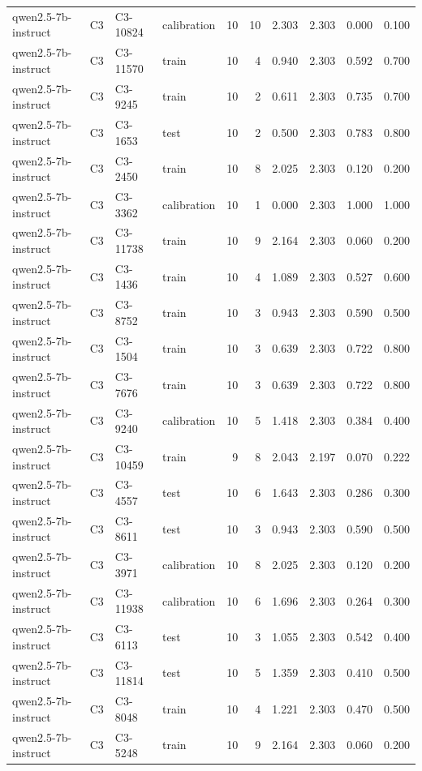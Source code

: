 \begin{table}
\begin{tabular}{llllrrrrrr}
qwen2.5-7b-instruct & C3 & C3-10824 & calibration & 10 & 10 & 2.303 & 2.303 & 0.000 & 0.100 \\
qwen2.5-7b-instruct & C3 & C3-11570 & train & 10 & 4 & 0.940 & 2.303 & 0.592 & 0.700 \\
qwen2.5-7b-instruct & C3 & C3-9245 & train & 10 & 2 & 0.611 & 2.303 & 0.735 & 0.700 \\
qwen2.5-7b-instruct & C3 & C3-1653 & test & 10 & 2 & 0.500 & 2.303 & 0.783 & 0.800 \\
qwen2.5-7b-instruct & C3 & C3-2450 & train & 10 & 8 & 2.025 & 2.303 & 0.120 & 0.200 \\
qwen2.5-7b-instruct & C3 & C3-3362 & calibration & 10 & 1 & 0.000 & 2.303 & 1.000 & 1.000 \\
qwen2.5-7b-instruct & C3 & C3-11738 & train & 10 & 9 & 2.164 & 2.303 & 0.060 & 0.200 \\
qwen2.5-7b-instruct & C3 & C3-1436 & train & 10 & 4 & 1.089 & 2.303 & 0.527 & 0.600 \\
qwen2.5-7b-instruct & C3 & C3-8752 & train & 10 & 3 & 0.943 & 2.303 & 0.590 & 0.500 \\
qwen2.5-7b-instruct & C3 & C3-1504 & train & 10 & 3 & 0.639 & 2.303 & 0.722 & 0.800 \\
qwen2.5-7b-instruct & C3 & C3-7676 & train & 10 & 3 & 0.639 & 2.303 & 0.722 & 0.800 \\
qwen2.5-7b-instruct & C3 & C3-9240 & calibration & 10 & 5 & 1.418 & 2.303 & 0.384 & 0.400 \\
qwen2.5-7b-instruct & C3 & C3-10459 & train & 9 & 8 & 2.043 & 2.197 & 0.070 & 0.222 \\
qwen2.5-7b-instruct & C3 & C3-4557 & test & 10 & 6 & 1.643 & 2.303 & 0.286 & 0.300 \\
qwen2.5-7b-instruct & C3 & C3-8611 & test & 10 & 3 & 0.943 & 2.303 & 0.590 & 0.500 \\
qwen2.5-7b-instruct & C3 & C3-3971 & calibration & 10 & 8 & 2.025 & 2.303 & 0.120 & 0.200 \\
qwen2.5-7b-instruct & C3 & C3-11938 & calibration & 10 & 6 & 1.696 & 2.303 & 0.264 & 0.300 \\
qwen2.5-7b-instruct & C3 & C3-6113 & test & 10 & 3 & 1.055 & 2.303 & 0.542 & 0.400 \\
qwen2.5-7b-instruct & C3 & C3-11814 & test & 10 & 5 & 1.359 & 2.303 & 0.410 & 0.500 \\
qwen2.5-7b-instruct & C3 & C3-8048 & train & 10 & 4 & 1.221 & 2.303 & 0.470 & 0.500 \\
qwen2.5-7b-instruct & C3 & C3-5248 & train & 10 & 9 & 2.164 & 2.303 & 0.060 & 0.200 \\

\end{tabular}
\end{table}
